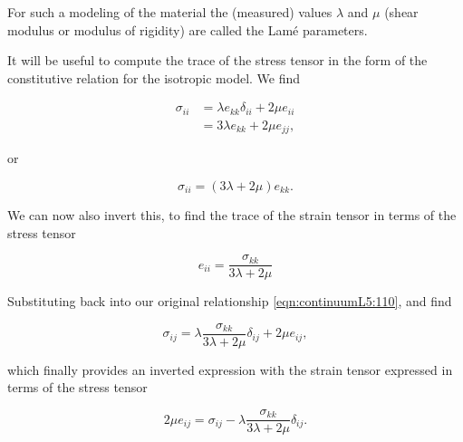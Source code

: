 For such a modeling of the material the (measured) values $\lambda$ and $\mu$ (shear modulus or modulus of rigidity) are called the Lam\'e parameters.

It will be useful to compute the trace of the stress tensor in the form of the constitutive relation for the isotropic model.  We find

\begin{align*}
\sigma_{ii}
&= \lambda e_{kk} \delta_{ii} + 2 \mu e_{ii} \\
&= 3 \lambda e_{kk} + 2 \mu e_{jj},
\end{align*}

or

\begin{equation}\label{eqn:continuumL5:150}
\sigma_{ii} = (3 \lambda + 2 \mu) e_{kk}.
\end{equation}

We can now also invert this, to find the trace of the strain tensor in terms of the stress tensor

\begin{equation}\label{eqn:continuumL5:130}
e_{ii} = \frac{\sigma_{kk}}{3 \lambda + 2 \mu}
\end{equation}

Substituting back into our original relationship \ref{eqn:continuumL5:110}, and find

\begin{equation}\label{eqn:continuumL5:110b}
\sigma_{ij} = \lambda \frac{\sigma_{kk}}{3 \lambda + 2 \mu} \delta_{ij} + 2 \mu e_{ij},
\end{equation}

which finally provides an inverted expression with the strain tensor expressed in terms of the stress tensor

\begin{equation}\label{eqn:continuumL5:110c}
\boxed{
2 \mu e_{ij} =
\sigma_{ij} - \lambda \frac{\sigma_{kk}}{3 \lambda + 2 \mu} \delta_{ij}.
}
\end{equation}

